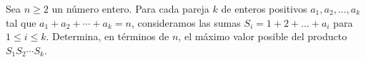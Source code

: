 Sea $n\geq 2$ un número entero. Para cada pareja $k$ de enteros positivos $a_1, a_2, \ldots, a_k$ tal que $a_1+a_2+\cdots +a_k=n$, consideramos las sumas $S_i=1+2+\ldots +a_i$ para $1\leq i\leq k$. Determina, en términos de $n$, el máximo valor posible del producto $S_1S_2\cdots S_k$.